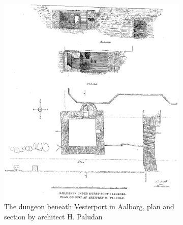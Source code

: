 \begin{figure}
    \centering
    \begin{subfigure}[h!]{0.55\textwidth}
    	\centering
        \includegraphics[width=\textwidth]{figures/sketch0.png}
        \caption{The dungeon beneath Vesterport in Aalborg, plan and section by architect H. Paludan \cite{Jensen1909}}\label{fig:sketch0}
    \end{subfigure}
    \hspace{0.5cm}
    \begin{subfigure}[h!]{0.4\textwidth}
    	\centering

\end{subfigure}
\end{figure}

